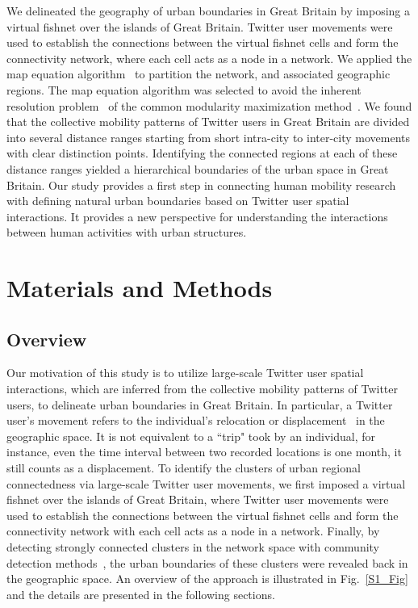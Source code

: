 \documentclass[10pt,letterpaper]{article}
\begin{document}
We delineated the geography of urban boundaries in Great Britain by imposing a virtual fishnet over the islands of Great Britain. 
Twitter user movements were used to establish the connections between the virtual fishnet cells and form the connectivity network, where each cell acts as a node in a network.
We applied the map equation algorithm~\cite{domenico2015} to partition the network,  and associated geographic regions.
The map equation algorithm was selected to avoid the inherent resolution problem~\cite{fortunato2007} of the common modularity maximization method~\cite{newman2006}. 
We found that the collective mobility patterns of Twitter users in Great Britain are divided into several distance ranges starting from short intra-city to inter-city movements with clear distinction points. 
Identifying the connected regions at each of these distance ranges yielded a hierarchical boundaries of  the urban space in Great Britain.
Our study provides a first step in connecting human mobility research with defining natural urban boundaries based on Twitter user spatial interactions. It provides a new perspective for understanding the interactions between human activities with urban structures. 

\section*{Materials and Methods}
\subsection*{Overview}
Our motivation of this study is to utilize large-scale Twitter user spatial interactions, which are inferred from the collective mobility patterns of Twitter users, to delineate urban boundaries in Great Britain.
In particular, a Twitter user's movement refers to the individual's relocation or displacement~\cite{gonzalez2008} in the geographic space.
It is not equivalent to a ``trip" took by an individual, for instance, even the time interval between two recorded locations is one month, it still counts as a displacement.
To identify the clusters of urban regional connectedness via large-scale Twitter user movements, we first imposed a virtual fishnet over the islands of Great Britain, where Twitter user movements were used to establish the connections between the virtual fishnet cells and form the connectivity network with each cell acts as a node in a network. 
Finally, by detecting strongly connected clusters in the network space with community detection methods~\cite{coscia2011}, the urban boundaries of these clusters were revealed back in the geographic space. 
An overview of the approach is illustrated in Fig.~\ref{S1_Fig} and the details are presented in the following sections. 
\end{document}
